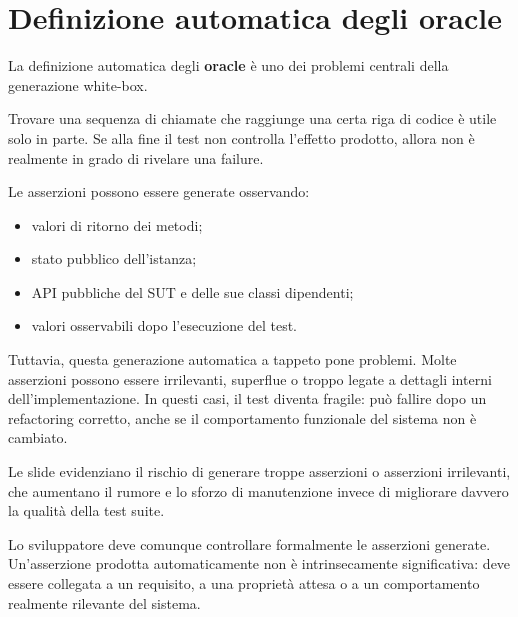 \section{Definizione automatica degli oracle}

La definizione automatica degli \textbf{oracle} è uno dei problemi centrali della generazione white-box.

Trovare una sequenza di chiamate che raggiunge una certa riga di codice è utile solo in parte. Se alla fine il test non controlla l'effetto prodotto, allora non è realmente in grado di rivelare una failure.

Le asserzioni possono essere generate osservando:

\begin{itemize}

\item valori di ritorno dei metodi;

\item stato pubblico dell'istanza;

\item API pubbliche del SUT e delle sue classi dipendenti;

\item valori osservabili dopo l'esecuzione del test.

\end{itemize}

Tuttavia, questa generazione automatica a tappeto pone problemi. Molte asserzioni possono essere irrilevanti, superflue o troppo legate a dettagli interni dell'implementazione. In questi casi, il test diventa fragile: può fallire dopo un refactoring corretto, anche se il comportamento funzionale del sistema non è cambiato.

\begin{notaslide}

Le slide evidenziano il rischio di generare troppe asserzioni o asserzioni irrilevanti, che aumentano il rumore e lo sforzo di manutenzione invece di migliorare davvero la qualità della test suite.

\end{notaslide}

\begin{notaprof}

Lo sviluppatore deve comunque controllare formalmente le asserzioni generate. Un'asserzione prodotta automaticamente non è intrinsecamente significativa: deve essere collegata a un requisito, a una proprietà attesa o a un comportamento realmente rilevante del sistema.

\end{notaprof}

